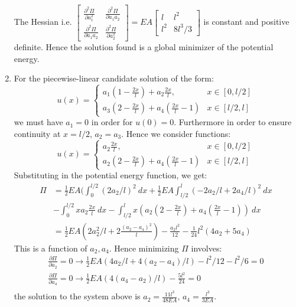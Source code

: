 \documentclass{article}
\newcommand{\ee}{\end{equation}}
\newcommand{\be}{\begin{equation}}
\newcommand{\pa}{\partial}
\begin{document}
\begin{enumerate}
The Hessian i.e. $\left[ \begin{array}{ll} \frac{\pa^2 \Pi}{\pa a_1^2} & \frac{\pa^2 \Pi}{\pa a_1a_2} \\ \frac{\pa^2 \Pi}{\pa a_1a_2} & \frac{\pa^2 \Pi}{\pa a_2^2} \end{array} \right]=EA \left[ \begin{array}{ll}  l  & l^2 \\ l^2 &  8l^3/3 \end{array} \right]$ is constant and positive definite. Hence the solution found is a global minimizer of the potential energy.


\item For the piecewise-linear candidate solution of the form:
\be
u(x)=\left\{ \begin{array}{ll} a_1(1-\frac{2x}{l})+a_2 \frac{2x}{l}, & x\in [0,l/2] \\
                               a_3(2-\frac{2x}{l})+a_4 (\frac{2x}{l}-1)& x\in [l/2,l] 
             \end{array} \right.
\ee
we must have $a_1=0$ in order for $u(0)=0$. Furthermore in order to ensure continuity at $x=l/2$, $a_2=a_3$. Hence we consider functions:
\be
u(x)=\left\{ \begin{array}{ll} a_2 \frac{2x}{l}, & x\in [0,l/2] \\
                               a_2(2-\frac{2x}{l})+a_4 (\frac{2x}{l}-1)& x\in [l/2,l] 
             \end{array} \right.
\ee
             Substituting in the potential energy function, we get:
\be
\begin{array}{ll}
 \Pi &=\frac{1}{2} EA (\int_0^{l/2} (2a_2/l)^2 ~dx+\frac{1}{2} EA\int_{l/2}^l (-2a_2/l+2a_4/l)^2 ~dx \\
 &-\int_0^{l/2} x a_2 \frac{2x}{l} ~dx -\int_{l/2}^l x (a_2(2-\frac{2x}{l})+a_4 (\frac{2x}{l}-1) ) ~dx \\
&= \frac{1}{2} EA (2a_2^2/l+2\frac{(a_2-a_4)^2}{l})-\frac{a_2l^2}{12}-\frac{1}{24} l^2(4a_2+5a_4)
\end{array}
 \ee            
 This is a function of $a_2,a_4$. Hence minimizing $\Pi$ involves:
\be
\begin{array}{l}
 \frac{\pa \Pi}{\pa a_2}=0 \to \frac{1}{2} EA(4a_2/l +4(a_2-a_4)/l)-l^2/12-l^2/6=0 \\
  \frac{\pa \Pi}{\pa a_4}=0 \to \frac{1}{2} EA(4(a_4-a_2)/l)- \frac{5l^2}{24} =0 \\
\end{array}
\label{eq:pe2}
\ee
the solution to the system above is $a_2=\frac{11 l^3}{48EA}$, $a_4=\frac{l^3}{3EA}$.


\end{enumerate}
\end{document}
